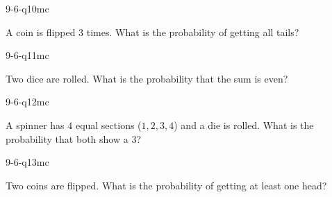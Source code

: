 \begin{practiceQuestion}{9-6-q10}{mc}
\begin{questionText}
A coin is flipped $3$ times. What is the probability of getting all tails?
\end{questionText}
\end{practiceQuestion}

\begin{practiceQuestion}{9-6-q11}{mc}
\begin{questionText}
Two dice are rolled. What is the probability that the sum is even?
\end{questionText}
\end{practiceQuestion}

\begin{practiceQuestion}{9-6-q12}{mc}
\begin{questionText}
A spinner has $4$ equal sections ($1, 2, 3, 4$) and a die is rolled. What is the probability that both show a $3$?
\end{questionText}
\end{practiceQuestion}

\begin{practiceQuestion}{9-6-q13}{mc}
\begin{questionText}
Two coins are flipped. What is the probability of getting at least one head?
\end{questionText}
\end{practiceQuestion}

